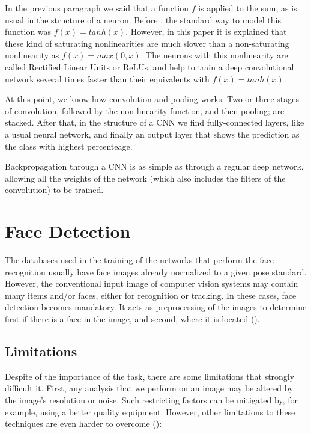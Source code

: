 In the previous paragraph we said that a function $f$ is applied to the sum, as is usual in the structure of a neuron. Before \cite{krizhevsky2012deep}, the standard way to model this function was $f(x)=tanh(x)$. However, in this paper it is explained that these kind of saturating nonlinearities are much slower than a non-saturating nonlinearity as $f(x)=max(0, x)$. The neurons with this nonlinearity are called Rectified Linear Units or ReLUs, and help to train a deep convolutional network several times faster than their equivalents with $f(x)=tanh(x)$.

At this point, we know how convolution and pooling works. Two or three stages of convolution, followed by the non-linearity function, and then pooling; are stacked. After that, in the structure of a CNN we find fully-connected layers, like a usual neural network, and finally an output layer that shows the prediction as the class with highest percenteage.

Backpropagation through a CNN is as simple as through a regular deep network, allowing all the weights of the network (which also includes the filters of the convolution) to be trained.

\section{Face Detection}
The databases used in the training of the networks that perform the face recognition usually have face images already normalized  to  a  given  pose  standard. However,  the  conventional  input  image  of  computer  vision  systems  may  contain many items and/or faces, either for recognition or tracking. In these cases, face detection becomes mandatory. It acts as preprocessing of the images to determine first
if there is a face in the image, and second, where it is located (\cite{marques2010face}).

	\subsection{Limitations}
	Despite of the importance of the task, there are some limitations that strongly difficult it. First, any analysis that we perform on an image may be altered by the image’s resolution or noise. Such restricting factors can be mitigated by, for example, using a better quality equipment. However, other limitations to these techniques are even harder to overcome (\cite{yang2002detecting}):


